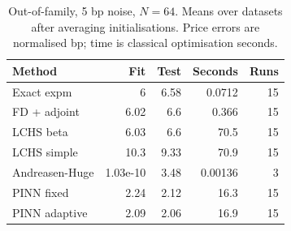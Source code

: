 \begin{table}[t]\centering\caption{Out-of-family, 5 bp noise, $N=64$. Means over datasets after averaging initialisations. Price errors are normalised bp; time is classical optimisation seconds.}
\label{tab:bench}\scriptsize\begin{tabular}{lrrrr}\toprule Method & Fit & Test & Seconds & Runs\\\midrule
Exact expm & 6 & 6.58 & 0.0712 & 15\\
FD + adjoint & 6.02 & 6.6 & 0.366 & 15\\
LCHS beta & 6.03 & 6.6 & 70.5 & 15\\
LCHS simple & 10.3 & 9.33 & 70.9 & 15\\
Andreasen-Huge & 1.03e-10 & 3.48 & 0.00136 & 3\\
PINN fixed & 2.24 & 2.12 & 16.3 & 15\\
PINN adaptive & 2.09 & 2.06 & 16.9 & 15\\
\bottomrule\end{tabular}\end{table}